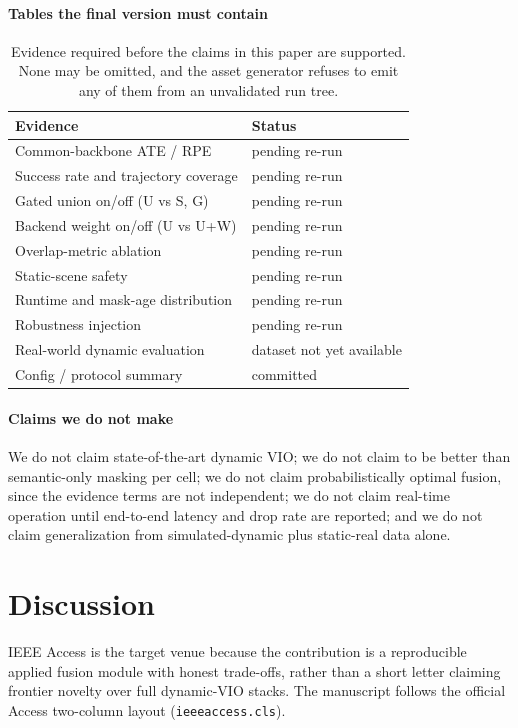\documentclass{ieeeaccess}
\begin{document}
\paragraph{Tables the final version must contain}
\begin{table}[t]
\centering
\caption{Evidence required before the claims in this paper are supported. None may be omitted, and the asset generator refuses to emit any of them from an unvalidated run tree.}
\label{tab:required_tables}
\begin{tabular}{ll}
\hline
Evidence & Status \\
\hline
Common-backbone ATE / RPE & pending re-run \\
Success rate and trajectory coverage & pending re-run \\
Gated union on/off (U vs S, G) & pending re-run \\
Backend weight on/off (U vs U+W) & pending re-run \\
Overlap-metric ablation & pending re-run \\
Static-scene safety & pending re-run \\
Runtime and mask-age distribution & pending re-run \\
Robustness injection & pending re-run \\
Real-world dynamic evaluation & dataset not yet available \\
Config / protocol summary & committed \\
\hline
\end{tabular}
\end{table}

\paragraph{Claims we do not make}
We do not claim state-of-the-art dynamic VIO; we do not claim to be better than semantic-only masking per cell; we do not claim probabilistically optimal fusion, since the evidence terms are not independent; we do not claim real-time operation until end-to-end latency and drop rate are reported; and we do not claim generalization from simulated-dynamic plus static-real data alone.

\section{Discussion}
\label{sec:discussion}
IEEE Access is the target venue because the contribution is a reproducible applied fusion module with honest trade-offs, rather than a short letter claiming frontier novelty over full dynamic-VIO stacks.
The manuscript follows the official Access two-column layout (\texttt{ieeeaccess.cls}).
\end{document}
